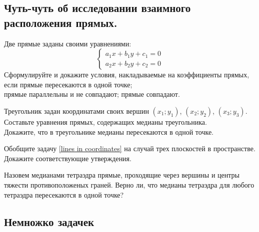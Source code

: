 \subsection*{Чуть-чуть об исследовании взаимного расположения прямых.}

\begin{problems}

\item \label{lines in coordinates}
Две прямые заданы своими уравнениями:
\[\left\{\begin{aligned}
    a_1 x + b_1 y + c_1 = 0\\
    a_2 x + b_2 y + c_2 = 0
\end{aligned}\right.\]
Сформулируйте и докажите условия, накладываемые на коэффициенты прямых, если
\quad
\sbp прямые пересекаются в одной точке;
\\
\sbp прямые параллельны и не совпадают;
\quad
\sbp прямые совпадают.

\item
Треугольник задан координатами своих вершин
$(x_1; y_1)$, $(x_2; y_2)$, $(x_3; y_3)$.
\\
\sbp Составьте уравнения прямых, содержащих медианы треугольника.
\\
\sbp Докажите, что в треугольнике медианы пересекаются в одной точке.

\item
Обобщите задачу \ref{lines in coordinates} на случай трех плоскостей в
пространстве.
Докажите соответствующие утверждения.

\item
Назовем медианами тетраэдра прямые, проходящие через вершины и центры тяжести
противоположеных граней.
Верно ли, что медианы тетраэдра для любого тетраэдра пересекаются в одной
точке?

\end{problems}

\subsection*{Немножко задачек}

